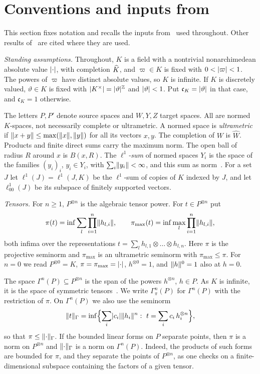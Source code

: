 \section{Conventions and inputs from \texorpdfstring{\cite{I}}{[I]}}\label{dp:sec:conv}

This section fixes notation and recalls the inputs from~\cite{I} used throughout. Other results of~\cite{I} are cited where they are used.

\emph{Standing assumptions.} Throughout, $K$ is a field with a nontrivial nonarchimedean absolute value $\lvert \cdot\rvert$, with completion $\widehat K$, and $\varpi\in K$ is fixed with $0<\lvert \varpi\rvert<1$. The powers of $\varpi$ have distinct absolute values, so $K$ is infinite. If $K$ is discretely valued, $\vartheta\in K$ is fixed with $\lvert K^\times\rvert=\lvert \vartheta\rvert^{\mathbb Z}$ and $\lvert \vartheta\rvert<1$. Put $\mathfrak c_K=\lvert \vartheta\rvert$ in that case, and $\mathfrak c_K=1$ otherwise.

The letters $P,P'$ denote source spaces and $W,Y,Z$ target spaces. All are normed $K$-spaces, not necessarily complete or ultrametric. A normed space is \emph{ultrametric} if $\lVert x+y\rVert\le\max(\lVert x\rVert,\lVert y\rVert)$ for all its vectors $x,y$. The completion of $W$ is $\widehat W$. Products and finite direct sums carry the maximum norm. The open ball of radius $R$ around $x$ is $B(x,R)$. The \emph{$\ell^1$-sum} of normed spaces $Y_i$ is the space of the families $(y_i)_i$, $y_i\in Y_i$, with $\sum_i\lVert y_i\rVert<\infty$, and this sum as norm~\cite[Definition~14.15]{I}. For a set $J$ let $\ell^1(J)=\ell^1(J,K)$ be the $\ell^1$-sum of copies of $K$ indexed by $J$, and let $\ell^1_{00}(J)$ be its subspace of finitely supported vectors.

\emph{Tensors.} For $n\ge1$, $P^{\otimes n}$ is the algebraic tensor power. For $t\in P^{\otimes n}$ put
\[
 \pi(t)=\inf\sum_l\prod_{i=1}^n\lVert h_{l,i}\rVert,\qquad
 \pi_{\max}(t)=\inf\max_l\prod_{i=1}^n\lVert h_{l,i}\rVert,
\]
both infima over the representations $t=\sum_lh_{l,1}\otimes\dots\otimes h_{l,n}$. Here $\pi$ is the projective seminorm and $\pi_{\max}$ is an ultrametric seminorm with $\pi_{\max}\le\pi$. For $n=0$ we read $P^{\otimes0}=K$, $\pi=\pi_{\max}=\lvert \cdot\rvert$, $h^{\otimes0}=1$, and $\lVert h\rVert^0=1$ also at $h=0$.

The space $\Gamma^n(P)\subseteq P^{\otimes n}$ is the span of the powers $h^{\otimes n}$, $h\in P$. As $K$ is infinite, it is the space of symmetric tensors~\cite[Section~L.3, opening paragraph]{I}. We write $\Gamma^n_\pi(P)$ for $\Gamma^n(P)$ with the restriction of $\pi$. On $\Gamma^n(P)$ we also use the seminorm
\begin{equation}\label{dp:eq:gamma-norm}
 \norm t_\Gamma=\inf\Bigl\{\sum_i\abs{c_i}\norm{h_i}^n:\ t=\sum_ic_i\,h_i^{\otimes n}\Bigr\},
\end{equation}
so that $\pi\le\lVert \cdot\rVert_\Gamma$. If the bounded linear forms on $P$ separate points, then $\pi$ is a norm on $P^{\otimes n}$ and $\lVert \cdot\rVert_\Gamma$ is a norm on $\Gamma^n(P)$. Indeed, the products of such forms are bounded for $\pi$, and they separate the points of $P^{\otimes n}$, as one checks on a finite-dimensional subspace containing the factors of a given tensor.

